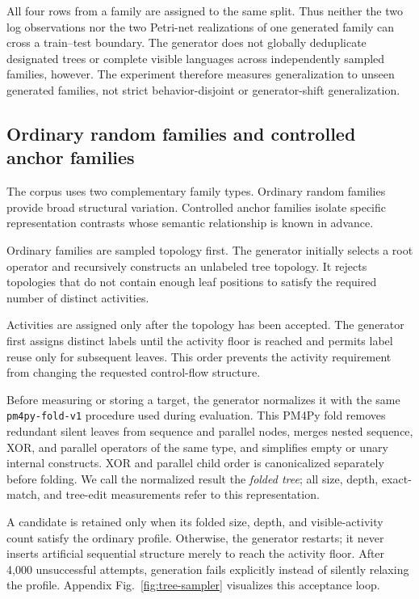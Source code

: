 \documentclass[pdflatex,sn-basic]{sn-jnl}
\begin{document}


All four rows from a family are assigned to the same split. Thus neither the two log observations nor the two Petri-net realizations of one generated family can cross a train--test boundary. The generator does not globally deduplicate designated trees or complete visible languages across independently sampled families, however. The experiment therefore measures generalization to unseen generated families, not strict behavior-disjoint or generator-shift generalization.

\subsection{Ordinary random families and controlled anchor families}

The corpus uses two complementary family types. Ordinary random families provide broad structural variation. Controlled anchor families isolate specific representation contrasts whose semantic relationship is known in advance.

Ordinary families are sampled topology first. The generator initially selects a root operator and recursively constructs an unlabeled tree topology. It rejects topologies that do not contain enough leaf positions to satisfy the required number of distinct activities.

Activities are assigned only after the topology has been accepted. The generator first assigns distinct labels until the activity floor is reached and permits label reuse only for subsequent leaves. This order prevents the activity requirement from changing the requested control-flow structure.

Before measuring or storing a target, the generator normalizes it with the same \texttt{pm4py-fold-v1} procedure used during evaluation. This PM4Py fold removes redundant silent leaves from sequence and parallel nodes, merges nested sequence, XOR, and parallel operators of the same type, and simplifies empty or unary internal constructs. XOR and parallel child order is canonicalized separately before folding. We call the normalized result the \emph{folded tree}; all size, depth, exact-match, and tree-edit measurements refer to this representation.

A candidate is retained only when its folded size, depth, and visible-activity count satisfy the ordinary profile. Otherwise, the generator restarts; it never inserts artificial sequential structure merely to reach the activity floor. After 4,000 unsuccessful attempts, generation fails explicitly instead of silently relaxing the profile. Appendix Fig.~\ref{fig:tree-sampler} visualizes this acceptance loop.
\end{document}
